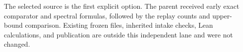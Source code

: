 The selected source is the first explicit option. The parent received early exact comparator and spectral formulas, followed by the replay counts and upper-bound comparison. Existing frozen files, inherited intake checks, Lean calculations, and publication are outside this independent lane and were not changed.
